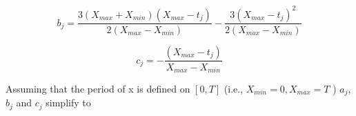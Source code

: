 \documentclass{article}
\begin{document}



\[ b_j= \frac{3(X_{max}+X_{min}) (X_{max}-t_j) }{2 (X_{max}-X_{min})} 
 -\frac{3   (X_{max}-t_j)^2  }{2 (X_{max}-X_{min})} \]

\[ c_j= - \frac{(X_{max}-t_j)}{X_{max}-X_{min}} \]


Assuming that the period of x is defined on \( [0, T] \) (i.e., \( X_{min}=0, X_{max}=T \) ) 
\(a_j \), \(b_j\) and \(c_j\) simplify to 
\end{document}
